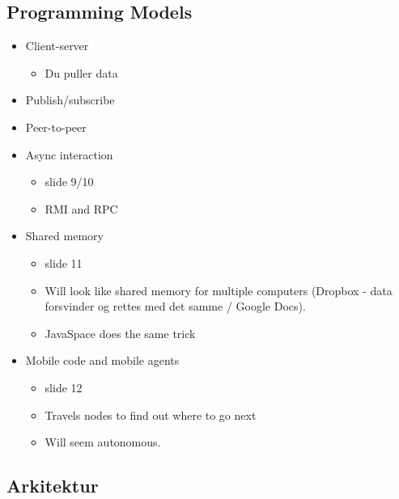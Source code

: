 \documentclass[oneside, 10pt]{memoir}
\begin{document}
\subsection{Programming Models}
\begin{itemize}
\item Client-server
	\begin{itemize}
	\item Du puller data
	\end{itemize}

\item Publish/subscribe
\item Peer-to-peer
\item Async interaction
	\begin{itemize}
	\item slide 9/10
	\item RMI and RPC
	\end{itemize}

\item Shared memory
	\begin{itemize}
	\item slide 11
	\item Will look like shared memory for multiple computers (Dropbox - data forsvinder og rettes med det samme / Google Docs).
	\item JavaSpace does the same trick
	\end{itemize}

\item Mobile code and mobile agents
	\begin{itemize}
	\item slide 12
	\item Travels nodes to find out where to go next
	\item Will seem autonomous.
	\end{itemize}

\end{itemize}


\subsection{Arkitektur}
\end{document}
